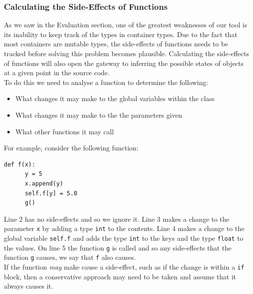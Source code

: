 \documentclass[12pt, titlepage]{article}
\begin{document}
\subsubsection*{Calculating the Side-Effects of Functions}
As we saw in the Evaluation section, one of the greatest weaknesses of our tool is its inability to keep track of the types in container types. Due to the fact that most containers are mutable types, the side-effects of functions needs to be tracked before solving this problem becomes plausible. Calculating the side-effects of functions will also open the gateway to inferring the possible states of objects at a given point in the source code. \\
\indent To do this we need to analyse a function to determine the following:
\begin{itemize}
	\item What changes it may make to the global variables within the class
	\item What changes it may make to the the parameters given
	\item What other functions it may call
\end{itemize}
For example, consider the following function:
\begin{lstlisting}[mathescape]
    def f(x):
      y = 5
      x.append(y)
      self.f[y] = 5.0
      g()
\end{lstlisting}
Line 2 has no side-effects and so we ignore it. Line 3 makes a change to the parameter \texttt{x} by adding a type \texttt{int} to the contents. Line 4 makes a change to the global variable \texttt{self.f} and adds the type \texttt{int} to the keys and the type \texttt{float} to the values. On line 5 the function \texttt{g} is called and so any side-effects that the function \texttt{g} causes, we say that \texttt{f} also causes. \\
\indent If the function \textit{may} make cause a side-effect, such as if the change is within a \texttt{if} block, then a conservative approach may need to be taken and assume that it always causes it.
\end{document}
